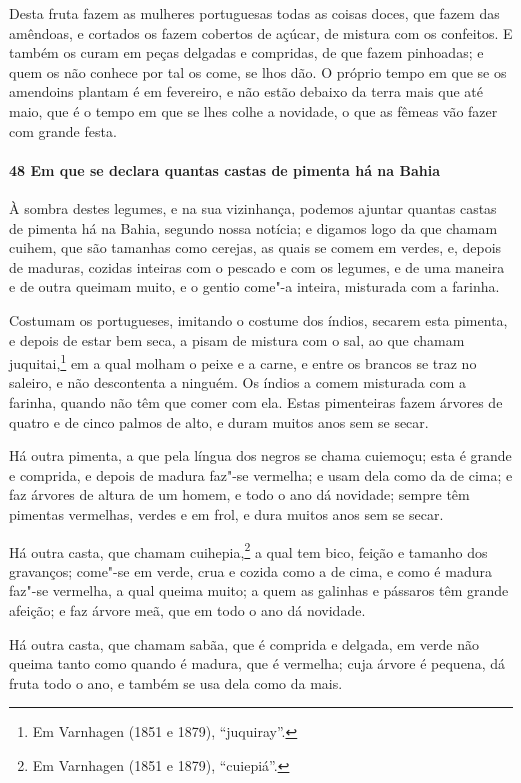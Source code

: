 \begin{linenumbers}
Desta fruta fazem as mulheres portuguesas todas as coisas doces, que fazem das amêndoas, e
cortados os fazem cobertos de açúcar, de mistura com os confeitos. E também os curam em
peças delgadas e compridas, de que fazem pinhoadas; e quem os não conhece por tal os come,
se lhos dão. O próprio tempo em que se os amendoins plantam é em fevereiro, e não estão
debaixo da terra mais que até maio, que é o tempo em que se lhes colhe a novidade, o que
as fêmeas vão fazer com grande festa.

\paragraph{48 Em que se declara quantas castas de pimenta há na Bahia}\quad
À sombra destes legumes, e na sua vizinhança, podemos ajuntar quantas castas de pimenta há
na Bahia, segundo nossa notícia; e digamos logo da que chamam cuihem, que são tamanhas
como cerejas, as quais se comem em verdes, e, depois de maduras, cozidas inteiras com o
pescado e com os legumes, e de uma maneira e de outra queimam muito, e o gentio come"-a
inteira, misturada com a farinha.

Costumam os portugueses, imitando o costume dos índios, secarem esta pimenta, e depois de
estar bem seca, a pisam de mistura com o sal, ao que chamam juquitai,\footnote{ Em
Varnhagen (1851 e 1879), ``juquiray''.} em a qual molham o peixe e a carne, e entre os
brancos se traz no saleiro, e não descontenta a ninguém. Os índios a comem misturada com a
farinha, quando não têm que comer com ela. Estas pimenteiras fazem árvores de quatro e de
cinco palmos de alto, e duram muitos anos sem se secar.

Há outra pimenta, a que pela língua dos negros se chama cuiemoçu; esta é grande e
comprida, e depois de madura faz"-se vermelha; e usam dela como da de cima; e faz árvores
de altura de um homem, e todo o ano dá novidade; sempre têm pimentas vermelhas, verdes e
em frol, e dura muitos anos sem se secar.

Há outra casta, que chamam cuihepia,\footnote{ Em Varnhagen (1851 e 1879), ``cuiepiá''.} a
qual tem bico, feição e tamanho dos gravanços; come"-se em verde, crua e cozida como a de
cima, e como é madura faz"-se vermelha, a qual queima muito; a quem as galinhas e pássaros
têm grande afeição; e faz árvore meã, que em todo o ano dá novidade.

Há outra casta, que chamam sabãa, que é comprida e delgada, em verde não queima tanto como
quando é madura, que é vermelha; cuja árvore é pequena, dá fruta todo o ano, e também se
usa dela como da mais.


\end{linenumbers}
